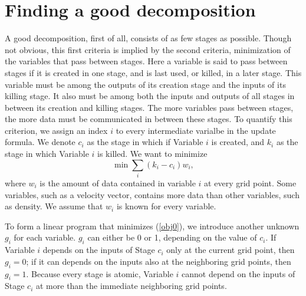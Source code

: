 \documentclass[12pt]{article}
\begin{document}
\section{Finding a good decomposition}

A good decomposition, first of all, consists of as few stages as possible.
Though not obvious, this first criteria is implied by the second
criteria, minimization of the variables that pass between stages.  Here a variable is said to pass between stages if it is created in one stage, and is last used, or killed, in a later stage.  This variable must be among the outputs of its creation stage and the inputs of its killing stage.  It also must be among both the inputs and outputs of all stages in between its creation and killing stages.  The more variables pass between stages, the more data must be communicated in between these stages.  To quantify this criterion, we assign an index $i$ to every intermediate varialbe in the update formula.  We denote $c_i$ as the stage in which if Variable $i$ is created, and $k_i$ as the stage in which Variable $i$ is killed.  We want to minimize
\begin{equation} \label{obj0}
\min \sum_i (k_i - c_i) w_i,
\end{equation}
where $w_i$ is the amount of data contained in variable $i$ at every grid point.  Some variables, such as a velocity vector, contains more data than other variables, such as density.  We assume that $w_i$ is known for every variable.

To form a linear program that minimizes (\ref{obj0}),
we introduce another unknown $g_i$ for each variable.
$g_i$ can either be 0 or 1, depending on the value of $c_i$.
If Variable $i$ depends on the inputs of Stage $c_i$ only at the current grid point, then $g_i=0$; if it can depends on the inputs also at the neighboring grid points, then $g_i=1$.  Because every stage is atomic, Variable $i$ cannot depend on the inputs of Stage $c_i$ at more than the immediate neighboring grid points.
\end{document}
